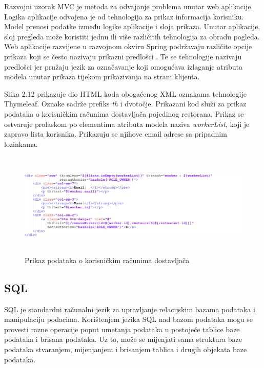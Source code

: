 \documentclass[times, utf8, zavrsni, numeric]{fer}
\begin{document}
Razvojni uzorak MVC je metoda za odvajanje problema unutar web aplikacije. Logika aplikacije odvojena je od tehnologija za prikaz informacija korisniku. Model prenosi podatke između logike aplikacije i sloja prikaza. Unutar aplikacije, sloj pregleda može koristiti jednu ili više različitih tehnologija za obradu pogleda. Web aplikacije razvijene u razvojnom okviru Spring podržavaju različite opcije prikaza koji se često nazivaju prikazni predlošci . Te se tehnologije nazivaju predlošci jer pružaju jezik za označavanje koji omogućava izlaganje atributa modela unutar prikaza tijekom prikazivanja na strani klijenta.

Slika 2.12 prikazuje dio HTML koda obogaćenog XML oznakama tehnologije Thymeleaf. Oznake sadrže prefiks \emph{th} i dvotočje. Prikazani kod služi za prikaz podataka o korisničkim računima dostavljača pojedinog restorana. Prikaz se ostvaruje prolaskom po elementima atributa modela naziva  \emph{workerList}, koji je zapravo lista korisnika. Prikazuju se njihove email adrese sa pripadnim lozinkama.
\begin{figure}[htb]
\includegraphics[height=5.0cm]{thymeleaf.png}
\caption{Prikaz podataka o korisničkim računima dostavljača}
\label{fig:thymeleaf}
\end{figure}
\subsection{SQL}
SQL  je standardni računalni jezik za upravljanje relacijskim bazama podataka i manipulaciju podacima. Korištenjem jezika SQL nad bazom podataka mogu se provesti razne operacije poput umetanja podataka u postojeće tablice baze podataka i brisana podataka. Uz to, može se mijenjati sama struktura baze podataka stvaranjem, mijenjanjem i brisanjem tablica i drugih objekata baze podataka.
\end{document}
